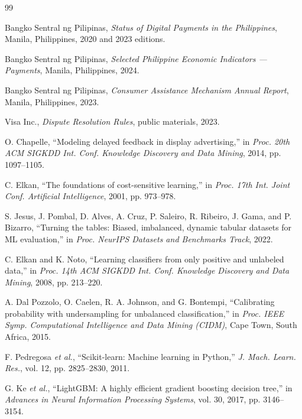 \documentclass[conference]{IEEEtran}
\begin{document}
\begin{thebibliography}{99}

Bangko Sentral ng Pilipinas, \emph{Status of Digital Payments in the
Philippines}, Manila, Philippines, 2020 and 2023 editions.

Bangko Sentral ng Pilipinas, \emph{Selected Philippine Economic
Indicators --- Payments}, Manila, Philippines, 2024.

Bangko Sentral ng Pilipinas, \emph{Consumer Assistance Mechanism Annual
Report}, Manila, Philippines, 2023.

Visa Inc., \emph{Dispute Resolution Rules}, public materials, 2023.

O. Chapelle, ``Modeling delayed feedback in display advertising,'' in
\emph{Proc. 20th ACM SIGKDD Int. Conf. Knowledge Discovery and Data
Mining}, 2014, pp. 1097--1105.

C. Elkan, ``The foundations of cost-sensitive learning,'' in \emph{Proc.
17th Int. Joint Conf. Artificial Intelligence}, 2001, pp. 973--978.

S. Jesus, J. Pombal, D. Alves, A. Cruz, P. Saleiro, R. Ribeiro, J. Gama,
and P. Bizarro, ``Turning the tables: Biased, imbalanced, dynamic tabular
datasets for ML evaluation,'' in \emph{Proc. NeurIPS Datasets and
Benchmarks Track}, 2022.

C. Elkan and K. Noto, ``Learning classifiers from only positive and
unlabeled data,'' in \emph{Proc. 14th ACM SIGKDD Int. Conf. Knowledge
Discovery and Data Mining}, 2008, pp. 213--220.

A. Dal Pozzolo, O. Caelen, R. A. Johnson, and G. Bontempi, ``Calibrating
probability with undersampling for unbalanced classification,'' in
\emph{Proc. IEEE Symp. Computational Intelligence and Data Mining (CIDM)},
Cape Town, South Africa, 2015.

F. Pedregosa \emph{et al.}, ``Scikit-learn: Machine learning in Python,''
\emph{J. Mach. Learn. Res.}, vol. 12, pp. 2825--2830, 2011.

G. Ke \emph{et al.}, ``LightGBM: A highly efficient gradient boosting
decision tree,'' in \emph{Advances in Neural Information Processing
Systems}, vol. 30, 2017, pp. 3146--3154.

\end{thebibliography}
\end{document}
